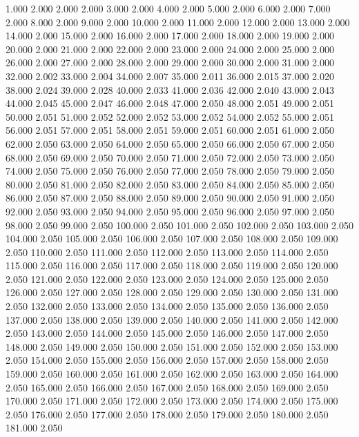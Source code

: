 1.000 2.000 
2.000 2.000 
3.000 2.000 
4.000 2.000 
5.000 2.000 
6.000 2.000 
7.000 2.000 
8.000 2.000 
9.000 2.000 
10.000 2.000 
11.000 2.000 
12.000 2.000 
13.000 2.000 
14.000 2.000 
15.000 2.000 
16.000 2.000 
17.000 2.000 
18.000 2.000 
19.000 2.000 
20.000 2.000 
21.000 2.000 
22.000 2.000 
23.000 2.000 
24.000 2.000 
25.000 2.000 
26.000 2.000 
27.000 2.000 
28.000 2.000 
29.000 2.000 
30.000 2.000 
31.000 2.000 
32.000 2.002 
33.000 2.004 
34.000 2.007 
35.000 2.011 
36.000 2.015 
37.000 2.020 
38.000 2.024 
39.000 2.028 
40.000 2.033 
41.000 2.036 
42.000 2.040 
43.000 2.043 
44.000 2.045 
45.000 2.047 
46.000 2.048 
47.000 2.050 
48.000 2.051 
49.000 2.051 
50.000 2.051 
51.000 2.052 
52.000 2.052 
53.000 2.052 
54.000 2.052 
55.000 2.051 
56.000 2.051 
57.000 2.051 
58.000 2.051 
59.000 2.051 
60.000 2.051 
61.000 2.050 
62.000 2.050 
63.000 2.050 
64.000 2.050 
65.000 2.050 
66.000 2.050 
67.000 2.050 
68.000 2.050 
69.000 2.050 
70.000 2.050 
71.000 2.050 
72.000 2.050 
73.000 2.050 
74.000 2.050 
75.000 2.050 
76.000 2.050 
77.000 2.050 
78.000 2.050 
79.000 2.050 
80.000 2.050 
81.000 2.050 
82.000 2.050 
83.000 2.050 
84.000 2.050 
85.000 2.050 
86.000 2.050 
87.000 2.050 
88.000 2.050 
89.000 2.050 
90.000 2.050 
91.000 2.050 
92.000 2.050 
93.000 2.050 
94.000 2.050 
95.000 2.050 
96.000 2.050 
97.000 2.050 
98.000 2.050 
99.000 2.050 
100.000 2.050 
101.000 2.050 
102.000 2.050 
103.000 2.050 
104.000 2.050 
105.000 2.050 
106.000 2.050 
107.000 2.050 
108.000 2.050 
109.000 2.050 
110.000 2.050 
111.000 2.050 
112.000 2.050 
113.000 2.050 
114.000 2.050 
115.000 2.050 
116.000 2.050 
117.000 2.050 
118.000 2.050 
119.000 2.050 
120.000 2.050 
121.000 2.050 
122.000 2.050 
123.000 2.050 
124.000 2.050 
125.000 2.050 
126.000 2.050 
127.000 2.050 
128.000 2.050 
129.000 2.050 
130.000 2.050 
131.000 2.050 
132.000 2.050 
133.000 2.050 
134.000 2.050 
135.000 2.050 
136.000 2.050 
137.000 2.050 
138.000 2.050 
139.000 2.050 
140.000 2.050 
141.000 2.050 
142.000 2.050 
143.000 2.050 
144.000 2.050 
145.000 2.050 
146.000 2.050 
147.000 2.050 
148.000 2.050 
149.000 2.050 
150.000 2.050 
151.000 2.050 
152.000 2.050 
153.000 2.050 
154.000 2.050 
155.000 2.050 
156.000 2.050 
157.000 2.050 
158.000 2.050 
159.000 2.050 
160.000 2.050 
161.000 2.050 
162.000 2.050 
163.000 2.050 
164.000 2.050 
165.000 2.050 
166.000 2.050 
167.000 2.050 
168.000 2.050 
169.000 2.050 
170.000 2.050 
171.000 2.050 
172.000 2.050 
173.000 2.050 
174.000 2.050 
175.000 2.050 
176.000 2.050 
177.000 2.050 
178.000 2.050 
179.000 2.050 
180.000 2.050 
181.000 2.050 
